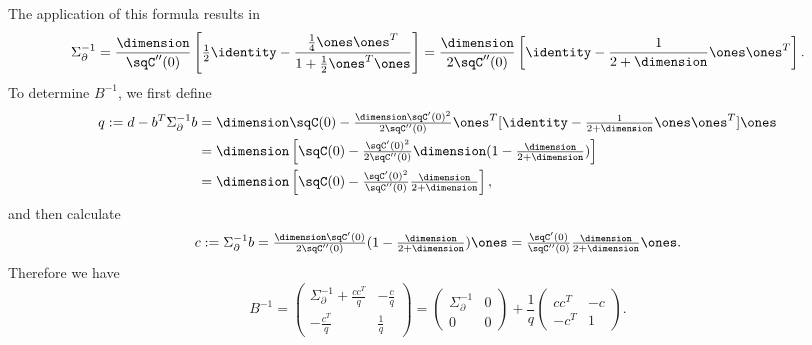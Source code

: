 The application of this formula results in
\begin{equation}\label{eq: sigma_partial inverse}
	\Sigma_\partial^{-1}
	= \frac{\dimension}{\sqC''(0)}\left[
		\tfrac12\identity - \frac{\tfrac14\ones\ones^T}{1+\tfrac12\ones^T\ones}
	\right]
	= \frac{\dimension}{2\sqC''(0)}\left[
		\identity - \frac{1}{2+\dimension}\ones\ones^T
	\right].
\end{equation}
To determine \(B^{-1}\), we first define
\begin{align*}
	q := d - b^T \Sigma_\partial^{-1}b
	&= \dimension\sqC(0) - \tfrac{\dimension\sqC'(0)^2}{2\sqC''(0)}\ones^T
	[\identity-\tfrac1{2+\dimension}\ones\ones^T]\ones\\
	&= \dimension\left[
		\sqC(0) - \tfrac{\sqC'(0)^2}{2\sqC''(0)}
		\dimension( 1-\tfrac{\dimension}{2+\dimension} )
	\right]\\
	&= \dimension\left[
		\sqC(0) - \tfrac{\sqC'(0)^2}{\sqC''(0)}
		\tfrac{\dimension}{2+\dimension}
	\right],
\end{align*}
and then calculate
\begin{equation}\label{eq: definition of c=sigma_partial^{-1} b}
	c:=\Sigma_\partial^{-1}b
	= \tfrac{\dimension\sqC'(0)}{2\sqC''(0)}( 1 - \tfrac{\dimension}{2+\dimension} )\ones
	= \tfrac{\sqC'(0)}{\sqC''(0)}\tfrac{\dimension}{2+\dimension}\ones.
\end{equation}
Therefore we have
\begin{equation}\label{eq: inv B split}
	B^{-1} = \begin{pmatrix}
		\Sigma_\partial^{-1}	+ \frac{cc^T}{q} & - \frac{c}{q}\\
		-\frac{c^T}{q} & \frac1q
	\end{pmatrix}
	= \begin{pmatrix}
		\Sigma_\partial^{-1} & 0 \\
		0 & 0
	\end{pmatrix}
	+ \frac1q \begin{pmatrix}
		cc^T & -c\\
		-c^T & 1
	\end{pmatrix}.
\end{equation}

